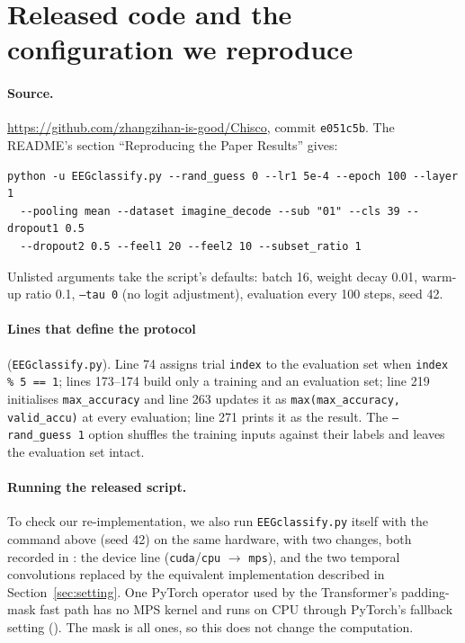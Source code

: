 \section{Released code and the configuration we reproduce}
\label{app:upstream}

\paragraph{Source.} \url{https://github.com/zhangzihan-is-good/Chisco}, commit
\texttt{e051c5b}. The README's section ``Reproducing the Paper Results'' gives:
{\small
\begin{verbatim}
python -u EEGclassify.py --rand_guess 0 --lr1 5e-4 --epoch 100 --layer 1
  --pooling mean --dataset imagine_decode --sub "01" --cls 39 --dropout1 0.5
  --dropout2 0.5 --feel1 20 --feel2 10 --subset_ratio 1
\end{verbatim}
}
Unlisted arguments take the script's defaults: batch 16, weight decay 0.01, warm-up ratio 0.1,
\texttt{--tau 0} (no logit adjustment), evaluation every 100 steps, seed 42.

\paragraph{Lines that define the protocol} (\texttt{EEGclassify.py}).
Line 74 assigns trial \texttt{index} to the evaluation set when \texttt{index \% 5 == 1};
lines 173--174 build only a training and an evaluation set; line 219 initialises \texttt{max\_accuracy} and line 263 updates it as
\texttt{max(max\_accuracy, valid\_accu)} at every evaluation; line 271 prints it as the result. The \texttt{--rand\_guess 1} option shuffles the training inputs against their labels
and leaves the evaluation set intact.

\paragraph{Running the released script.} To check our re-implementation, we also run
\texttt{EEGclassify.py} itself with the command above (seed 42) on the same hardware, with two
changes, both recorded in : the device line (\texttt{cuda}/\texttt{cpu}
$\rightarrow$ \texttt{mps}), and the two temporal convolutions replaced by the equivalent
implementation described in Section~\ref{sec:setting}. One PyTorch operator used by the
Transformer's padding-mask fast path has no MPS kernel and runs on CPU through PyTorch's
fallback setting (). The mask is all ones, so this does not
change the computation.

